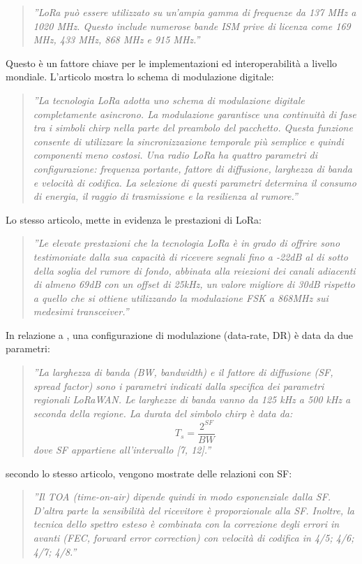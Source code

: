 \documentclass[a4paper]{report} %
\begin{document}
\begin{quote}
	\textit{''LoRa può essere utilizzato su un'ampia gamma di frequenze da 137 MHz a 1020 MHz. Questo include numerose bande ISM prive di licenza come 169 MHz, 433 MHz, 868 MHz e 915 MHz.''}
\end{quote}
Questo è un fattore chiave per le implementazioni ed interoperabilità a livello mondiale. L'articolo \cite{art:rif.23} mostra lo schema di modulazione digitale: 
\begin{quote}
	\textit{''La tecnologia LoRa adotta uno schema di modulazione digitale completamente asincrono. La modulazione garantisce una continuità di fase tra i simboli chirp nella parte del preambolo del pacchetto. Questa funzione consente di utilizzare la sincronizzazione temporale più semplice e quindi componenti meno costosi. Una radio LoRa ha quattro parametri di configurazione: frequenza portante, fattore di diffusione, larghezza di banda e velocità di codifica. La selezione di questi parametri determina il consumo di energia, il raggio di trasmissione e la resilienza al rumore.''}
\end{quote}
Lo stesso articolo, mette in evidenza le prestazioni di LoRa:	
\begin{quote}	
	\textit{''Le elevate prestazioni che la tecnologia LoRa è in grado di offrire sono testimoniate dalla sua capacità di ricevere segnali fino a -22dB al di sotto della soglia del rumore di fondo, abbinata alla reiezioni dei canali adiacenti di almeno 69dB con un offset di 25kHz, un valore migliore di 30dB rispetto a quello che si ottiene utilizzando la modulazione FSK a 868MHz sui medesimi transceiver.''}
\end{quote}
In relazione a \cite{art:rif.48}, una configurazione di modulazione (data-rate, DR) è data da due parametri:
\begin{quote}
	\textit{''La larghezza di banda (BW, bandwidth) e il fattore di diffusione (SF, spread factor) sono i parametri indicati dalla specifica dei parametri regionali LoRaWAN. Le larghezze di banda vanno da 125 kHz a 500 kHz a seconda della regione. La durata del simbolo chirp è data da:
	\begin{equation}
	T_s = \frac{2^{SF}}{BW}
	\end{equation}
	dove SF appartiene all'intervallo [7, 12].''}
\end{quote}
secondo lo stesso articolo, vengono mostrate delle relazioni con SF:
\begin{quote}
	\textit{''Il TOA (time-on-air) dipende quindi in modo esponenziale dalla SF. D'altra parte la sensibilità del ricevitore è proporzionale alla SF. Inoltre, la tecnica dello spettro esteso è combinata con la correzione degli errori in avanti (FEC, forward error correction) con velocità di codifica in {4/5; 4/6; 4/7; 4/8}.''}
\end{quote}
\end{document}
